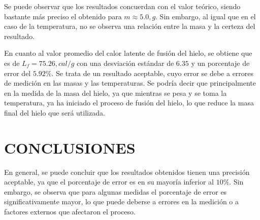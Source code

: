\documentclass[10pt]{article}
\begin{document}
\begin{multicols*}{2}
        Se puede observar que los resultados concuerdan con el valor teórico, siendo bastante más preciso el obtenido para $m \approx 5.0 , g$. Sin embargo, al igual que en el caso de la temperatura, no se observa una relación entre la masa y la certeza del resultado.

        En cuanto al valor promedio del calor latente de fusión del hielo, se obtiene que es de $L_f = 75.26 , cal / g$ con una desviación estándar de $6.35$ y un porcentaje de error del $5.92 \%$. Se trata de un resultado aceptable, cuyo error se debe a errores de medición en las masas y las temperaturas. Se podría decir que principalmente en la medida de la masa del hielo, ya que mientras se pesa y se toma la temperatura, ya ha iniciado el proceso de fusión del hielo, lo que reduce la masa final del hielo que será utilizada.

    
    \section{\small CONCLUSIONES}
    En general, se puede concluir que los resultados obtenidos tienen una precisión aceptable, ya que el porcentaje de error es en su mayoría inferior al $10 \%$. Sin embargo, se observa que para algunas medidas el porcentaje de error es significativamente mayor, lo que puede deberse a errores en la medición o a factores externos que afectaron el proceso. 






    \nocite{giancoli}
    \nocite{montiel2015física}

    
    
\end{multicols*}
\end{document}
